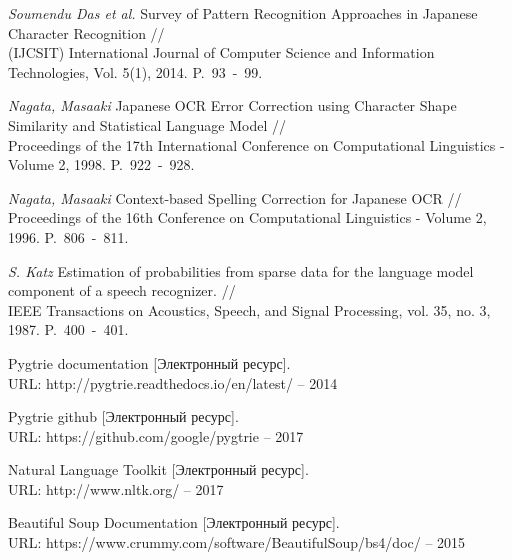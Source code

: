 
\begin{thebibliography}{00}
	
\textit{Soumendu Das et al.} Survey of Pattern Recognition Approaches in Japanese Character Recognition //\\
(IJCSIT) International Journal of Computer Science and Information Technologies, Vol. 5(1), 2014. P.~93~-~99.

\textit{Nagata, Masaaki} Japanese OCR Error Correction using Character Shape Similarity and Statistical Language Model //\\
Proceedings of the 17th International Conference on Computational Linguistics - Volume 2, 1998. P.~922~-~928.

\textit{Nagata, Masaaki} Context-based Spelling Correction for Japanese OCR //\\
Proceedings of the 16th Conference on Computational Linguistics - Volume 2, 1996. P.~806~-~811.

\textit{S. Katz} Estimation of probabilities from sparse data for the language model component of a speech recognizer. //\\
IEEE Transactions on Acoustics, Speech, and Signal Processing, vol. 35, no. 3, 1987. P.~400~-~401.

 Pygtrie documentation [Электронный ресурс]. \\ URL: http://pygtrie.readthedocs.io/en/latest/ -- 2014

 Pygtrie github [Электронный ресурс]. \\ URL: https://github.com/google/pygtrie -- 2017

 Natural Language Toolkit [Электронный ресурс]. \\ URL: http://www.nltk.org/ -- 2017

 Beautiful Soup Documentation [Электронный ресурс]. \\ URL: https://www.crummy.com/software/BeautifulSoup/bs4/doc/ -- 2015

\end{thebibliography}